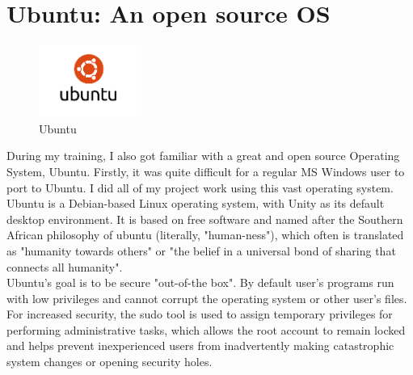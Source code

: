 
\section{Ubuntu: An open source OS}
\begin{figure}[!ht]
\centering
\includegraphics[width=0.3\textwidth]{input/images/ubu.png}
\caption{Ubuntu}
\hspace{-1.5em}
\end{figure}

During my training, I also got familiar with a great and open source Operating System, Ubuntu. Firstly, it was quite difficult for a regular MS Windows user to port to Ubuntu. I did all of my project work using this vast operating system. 
Ubuntu is a Debian-based Linux operating system, with Unity as its default desktop environment. It is based on free software and named after the Southern African philosophy of ubuntu (literally, "human-ness"), which often is translated as "humanity towards others" or "the belief in a universal bond of sharing that connects all humanity".\\

Ubuntu's goal is to be secure "out-of-the box". By default user's programs run with low privileges and cannot corrupt the operating system or other user's files. For increased security, the sudo tool is used to assign temporary privileges for performing administrative tasks, which allows the root account to remain locked and helps prevent inexperienced users from inadvertently making catastrophic system changes or opening security holes.\\


